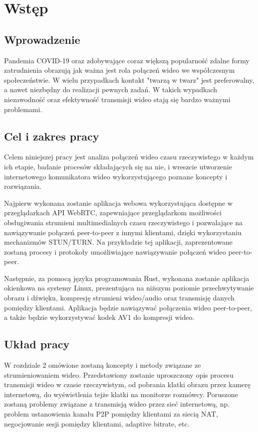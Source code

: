 \chapter{Wstęp}
\section{Wprowadzenie}

Pandemia COVID-19 oraz zdobywające coraz większą popularność zdalne formy zatrudnienia obrazują jak ważna jest rola
połączeń wideo we współczesnym społeczeństwie. W wielu przypadkach kontakt "twarzą w twarz" jest preferowalny, a nawet
niezbędny do realizacji pewnych zadań. W takich wypadkach niezawodność oraz efektywność transmisji wideo stają się
bardzo ważnymi problemami.

\section{Cel i zakres pracy}
Celem niniejszej pracy jest analiza połączeń wideo czasu rzeczywistego w każdym ich etapie, badanie procesów
składających się na nie, i wreszcie utworzenie internetowego komunikatora wideo wykorzystującego poznane koncepty i
rozwiązania.

Najpierw wykonana zostanie aplikacja webowa wykorzystująca dostępne w przeglądarkach API WebRTC, zapewniające
przeglądarkom możliwości obsługiwania strumieni multimedialnych czasu rzeczywistego i pozwalające na nawiązywanie
połączeń peer-to-peer z innymi klientami, dzięki wykorzystaniu mechanizmów STUN/TURN. Na przykładzie tej aplikacji,
zaprezentowane zostaną procesy i protokoły umożliwiające nawiązywanie połączeń wideo peer-to-peer.

Następnie, za pomocą języka programowania Rust, wykonana zostanie aplikacja okienkowa na systemy Linux, prezentująca na
niższym poziomie przechwytywanie obrazu i dźwięku, kompresję strumieni wideo/audio oraz transmisję danych pomiędzy
klientami. Aplikacja będzie nawiązywać połączenia wideo peer-to-peer, a także będzie wykorzystywać kodek AV1 do
kompresji wideo.

\section{Układ pracy}

W rozdziale 2 omówione zostaną koncepty i metody związane ze strumieniowaniem wideo. Przedstawiony zostanie uproszczony
opis procesu transmisji wideo w czasie rzeczywistym, od pobrania klatki obrazu przez kamerę internetową, do wyświetlenia
tejże klatki na monitorze rozmówcy. Poruszone zostaną problemy związane z transmisją wideo przez sieć internetową, np.
problem ustanowienia kanału P2P pomiędzy klientami za siecią NAT, negocjowanie sesji pomiędzy klientami, adaptive
bitrate, etc.

